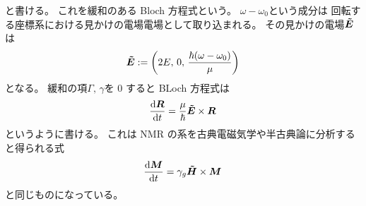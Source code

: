 \documentclass[11pt,dvipdfmx,a4paper]{jsarticle}
\begin{document}
と書ける。
これを緩和のある Bloch 方程式という。
\(\omega-\omega_0\)という成分は
回転する座標系における見かけの電場電場として取り込まれる。
その見かけの電場\({\vb*{\tilde{E}}}\)は
\begin{equation}
	\vb*{\tilde{E}} := \qty(2E,\,0,\,\frac{\hbar(\omega-\omega_0)}{\mu})
\end{equation}
となる。
緩和の項\(\Gamma,\,\gamma\)を 0 すると
BLoch 方程式は
\begin{equation}
	\dv{\vb*{R}}{t} = \frac{\mu}{\hbar}\vb*{\tilde{E}}\times\vb*{R}
\end{equation}
というように書ける。
これは NMR の系を古典電磁気学や半古典論に分析すると得られる式
\begin{equation}
	\dv{\vb*{M}}{t} = \gamma_g \vb*{\tilde{H}} \times \vb*{M}
\end{equation}
と同じものになっている。




\end{document}
